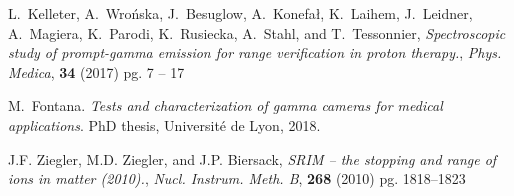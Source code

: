 \documentclass[a4paper,11pt]{article}
\begin{document}
\begin{thebibliography}{99}
 L.~Kelleter, A.~Wrońska, J.~Besuglow, A.~Konefał, K.~Laihem, J.~Leidner, A.~Magiera, K.~Parodi, K.~Rusiecka, A.~Stahl, and T.~Tessonnier, \emph{Spectroscopic study of prompt-gamma emission for range verification in proton therapy.}, \emph{Phys. Medica}, \textbf{34} (2017) pg. 7 -- 17

M.~Fontana.
\newblock \emph{{Tests and characterization of gamma cameras for medical
  applications}}.
\newblock Ph{D} thesis, {Universit{\'e} de Lyon}, 2018.

J.F. Ziegler, M.D. Ziegler, and J.P. Biersack, \emph{{SRIM} – the stopping and range of ions in matter (2010).}, \emph{Nucl. Instrum. Meth. B}, \textbf{268} (2010) pg. 1818--1823

\end{thebibliography}
\end{document}
